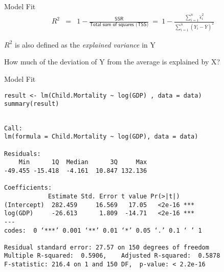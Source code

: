 \documentclass[presentation]{beamer}
\begin{document}
\begin{frame}[label={sec:org882112c}]{Model Fit}
\begin{eqnarray*}
      R^2 & = & 1 - \frac{\textsf{SSR}}{\textsf{Total sum of squares (TSS)}}  \ = \ 1 - \frac{\sum_{i=1}^n \hat\epsilon_i^2}{\sum_{i=1}^n (Y_i - \overline{Y})^2}
    \end{eqnarray*}

\(R^{2}\) is also defined as the \emph{explained variance} in Y

How much of the deviation of Y from the average is explained by X?
\end{frame}



\begin{frame}[fragile,shrink=15,label={sec:orgf8d2db1}]{Model Fit}
 \begin{verbatim}
result <- lm(Child.Mortality ~ log(GDP) , data = data)
summary(result)
\end{verbatim}

\begin{verbatim}

Call:
lm(formula = Child.Mortality ~ log(GDP), data = data)

Residuals:
    Min      1Q  Median      3Q     Max 
-49.455 -15.418  -4.161  10.847 132.136 

Coefficients:
            Estimate Std. Error t value Pr(>|t|)    
(Intercept)  282.459     16.569   17.05   <2e-16 ***
log(GDP)     -26.613      1.809  -14.71   <2e-16 ***
---
codes:  0 ‘***’ 0.001 ‘**’ 0.01 ‘*’ 0.05 ‘.’ 0.1 ‘ ’ 1

Residual standard error: 27.57 on 150 degrees of freedom
Multiple R-squared:  0.5906,	Adjusted R-squared:  0.5878 
F-statistic: 216.4 on 1 and 150 DF,  p-value: < 2.2e-16
\end{verbatim}
\end{frame}
\end{document}
